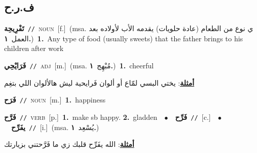 \documentclass[10pt,a4paper,twoside]{article} %
\begin{document}
\begin{multicols}{2}
\vspace{-3mm}
\subsection*{\color{blue}\foreignlanguage{arabic}{ف.ر.ح}\color{blue}{}} 

{\setlength\topsep{0pt}\textbf{\foreignlanguage{arabic}{تَفْرِيحِة}}\ {\color{gray}\texttt{//}\color{black}}\ \textsc{noun}\ [f.]\ \color{gray}(msa. \foreignlanguage{arabic}{ي نوع من الطعام (عادة حلويات) يقدمه الأب لأولاده بعد العمل}~\foreignlanguage{arabic}{\textbf{١.}})\color{black}\ \textbf{1.}~Any type of food (usually sweets) that the father brings to his children after work\ } \vspace{2mm}

{\setlength\topsep{0pt}\textbf{\foreignlanguage{arabic}{فَرَايْحِي}}\ {\color{gray}\texttt{//}\color{black}}\ \textsc{adj}\ [m.]\ \color{gray}(msa. \foreignlanguage{arabic}{مُبْهِج}~\foreignlanguage{arabic}{\textbf{١.}})\color{black}\ \textbf{1.}~cheerful\  \begin{flushright}\color{gray}\foreignlanguage{arabic}{\textbf{\underline{\foreignlanguage{arabic}{أمثلة}}}: يختي البسي لمّاع أو ألوان فَرايحية ليش هالألوان اللي بتغِم}\end{flushright}\color{black}} \vspace{2mm}

{\setlength\topsep{0pt}\textbf{\foreignlanguage{arabic}{فَرَح}}\ {\color{gray}\texttt{//}\color{black}}\ \textsc{noun}\ [m.]\ \textbf{1.}~happiness\ } \vspace{2mm}

{\setlength\topsep{0pt}\textbf{\foreignlanguage{arabic}{فَرَّح}}\ {\color{gray}\texttt{//}\color{black}}\ \textsc{verb}\ [p.]\ \textbf{1.}~make sb happy.  \textbf{2.}~gladden\ \ $\bullet$\ \ \setlength\topsep{0pt}\textbf{\foreignlanguage{arabic}{فَرِّح}}\ {\color{gray}\texttt{//}\color{black}}\ [c.]\ \ $\bullet$\ \ \setlength\topsep{0pt}\textbf{\foreignlanguage{arabic}{يفَرِّح}}\ {\color{gray}\texttt{//}\color{black}}\ [i.]\ \color{gray}(msa. \foreignlanguage{arabic}{يُسْعِد}~\foreignlanguage{arabic}{\textbf{١.}})\color{black}\  \begin{flushright}\color{gray}\foreignlanguage{arabic}{\textbf{\underline{\foreignlanguage{arabic}{أمثلة}}}: الله يفَرِّح قلبك زي ما فَرَّحتني بزيارتك}\end{flushright}\color{black}} \vspace{2mm}


\end{multicols}
\end{document}
